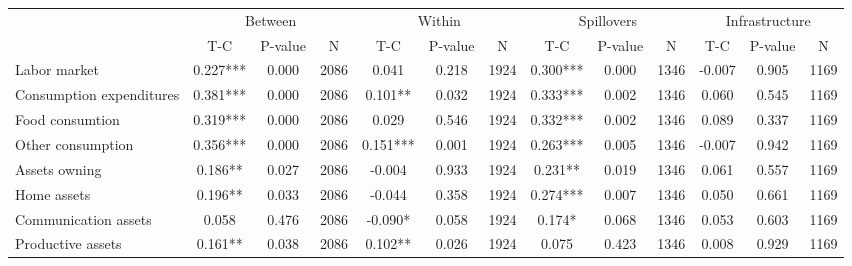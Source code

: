 
\begin{tabular}{l*{12}{c}}\hline&\multicolumn{3}{c}{Between}&\multicolumn{3}{c}{Within}&\multicolumn{3}{c}{Spillovers}&\multicolumn{3}{c}{Infrastructure} \\ \cmidrule(r){2-4}\cmidrule(l){5-7}\cmidrule(l){8-10}\cmidrule(l){9-13} & {T-C} & {P-value} & {N} & {T-C} & {P-value} & {N}  & {T-C} & {P-value} & {N} & {T-C} & {P-value} & {N} \\ \midrule

 Labor market &        0.227*** &        0.000 & 2086    &        0.041 &        0.218 & 1924    &        0.300*** &        0.000 & 1346 &       -0.007 &        0.905 & 1169 \\ 

 Consumption expenditures &        0.381*** &        0.000 & 2086    &        0.101** &        0.032 & 1924    &        0.333*** &        0.002 & 1346 &        0.060 &        0.545 & 1169 \\ 

 Food consumtion &        0.319*** &        0.000 & 2086    &        0.029 &        0.546 & 1924    &        0.332*** &        0.002 & 1346 &        0.089 &        0.337 & 1169 \\ 

 Other consumption &        0.356*** &        0.000 & 2086    &        0.151*** &        0.001 & 1924    &        0.263*** &        0.005 & 1346 &       -0.007 &        0.942 & 1169 \\ 

 Assets owning &        0.186** &        0.027 & 2086    &       -0.004 &        0.933 & 1924    &        0.231** &        0.019 & 1346 &        0.061 &        0.557 & 1169 \\ 

 Home assets &        0.196** &        0.033 & 2086    &       -0.044 &        0.358 & 1924    &        0.274*** &        0.007 & 1346 &        0.050 &        0.661 & 1169 \\ 

 Communication assets &        0.058 &        0.476 & 2086    &       -0.090* &        0.058 & 1924    &        0.174* &        0.068 & 1346 &        0.053 &        0.603 & 1169 \\ 

 Productive assets &        0.161** &        0.038 & 2086    &        0.102** &        0.026 & 1924    &        0.075 &        0.423 & 1346 &        0.008 &        0.929 & 1169 \\ 


\end{tabular}
